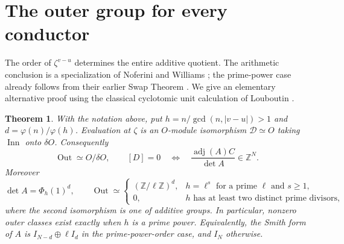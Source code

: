 \documentclass[11pt]{article}
\newtheorem{theorem}{Theorem}
\newcommand{\ZZ}{\mathbb Z}
\newcommand{\Der}{\mathcal D}
\newcommand{\Inn}{\operatorname{Inn}}
\newcommand{\Out}{\operatorname{Out}}
\newcommand{\adj}{\operatorname{adj}}
\begin{document}
\section{The outer group for every conductor}
The order of $\zeta^{v-u}$ determines the entire additive quotient.
The arithmetic conclusion is a specialization of Noferini and Williams
\cite[Theorems 2.2 and 2.4, pp.~5--7]{NW26}; the prime-power case
already follows from their earlier Swap Theorem
\cite[Theorem 3.11, p.~10]{NW24}. We give an elementary alternative
proof using the classical cyclotomic unit calculation of Louboutin
\cite[Lemma 1, p.~76]{Louboutin}.
\begin{theorem}\label{thm:general}
With the notation above, put $h=n/\gcd(n,|v-u|)>1$ and
$d=\varphi(n)/\varphi(h)$. Evaluation at $\zeta$ is an $O$-module
isomorphism $\Der\simeq O$ taking $\Inn$ onto $\delta O$. Consequently
\begin{equation}\label{eq:quotient}
 \Out\simeq O/\delta O,\qquad
 [D]=0\quad\Longleftrightarrow\quad
 \frac{\adj(A)C}{\det A}\in\ZZ^N.
\end{equation}
Moreover
\begin{equation}\label{eq:norm}
 \det A=\Phi_h(1)^d,\qquad
 \Out\simeq
 \begin{cases}
  (\ZZ/\ell\ZZ)^d,&h=\ell^s\text{ for a prime }\ell\text{ and }s\geq1,\\
  0,&h\text{ has at least two distinct prime divisors},
 \end{cases}
\end{equation}
where the second isomorphism is one of additive groups. In particular,
nonzero outer classes exist exactly when $h$ is a prime power.
Equivalently, the Smith form of $A$ is $I_{N-d}\oplus\ell I_d$ in
the prime-power-order case, and $I_N$ otherwise.
\end{theorem}
\end{document}
